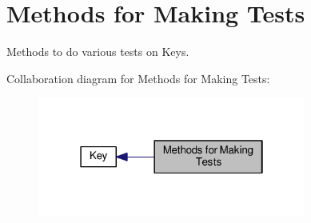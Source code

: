 \hypertarget{group__keytest}{\section{Methods for Making Tests}
\label{group__keytest}
}


Methods to do various tests on Keys.  


Collaboration diagram for Methods for Making Tests\+:
\nopagebreak
\begin{figure}[H]
\begin{center}
\leavevmode
\includegraphics[width=250pt]{group__keytest}
\end{center}
\end{figure}
